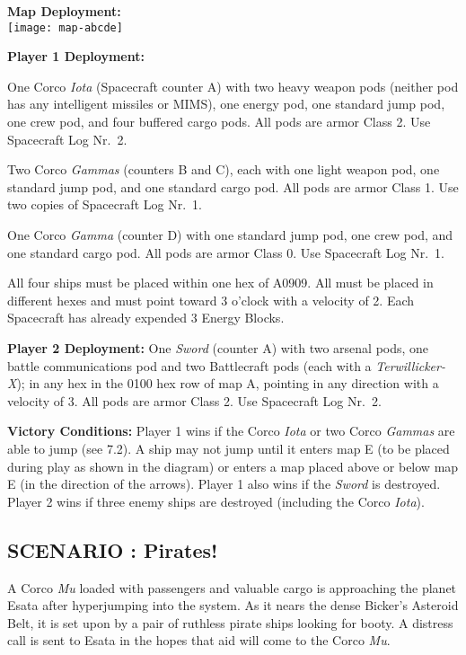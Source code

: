 \textbf{Map Deployment:}\\
\texttt{[image: map-abcde]}

\textbf{Player 1 Deployment:}

One Corco \emph{Iota} (Spacecraft counter A) with two heavy weapon pods
(neither pod has any intelligent missiles or MIMS), one energy pod,
one standard jump pod, one crew pod, and four buffered cargo pods. All
pods are armor Class 2. Use Spacecraft Log Nr.~2.

Two Corco \emph{Gammas} (counters B and C), each with one light weapon
pod, one standard jump pod, and one standard cargo pod. All pods are
armor Class 1. Use two copies of Spacecraft Log Nr.~1.

One Corco \emph{Gamma} (counter D) with one standard jump pod, one
crew pod, and one standard cargo pod. All pods are armor Class 0.  Use
Spacecraft Log Nr.~1.

All four ships must be placed within one hex of A0909. All must be
placed in different hexes and must point toward 3 o'clock with a
velocity of 2. Each Spacecraft has already expended 3 Energy Blocks.

\textbf{Player 2 Deployment:} One \emph{Sword} (counter A) with two
arsenal pods, one battle communications pod and two Battlecraft pods
(each with a \emph{Terwillicker-X}); in any hex in the 0100 hex row of
map A, pointing in any direction with a velocity of 3. All pods are
armor Class 2. Use Spacecraft Log Nr.~2.

\textbf{Victory Conditions:} Player 1 wins if the Corco \emph{Iota} or
two Corco \emph{Gammas} are able to jump (see 7.2). A ship may not
jump until it enters map E (to be placed during play as shown in the
diagram) or enters a map placed above or below map E (in the direction
of the arrows). Player 1 also wins if the \emph{Sword} is destroyed.
Player 2 wins if three enemy ships are destroyed (including the Corco
\emph{Iota}).



\subsection*{SCENARIO \thescenario: Pirates!}
\label{sec:scenario-4:-pirates}



A Corco \emph{Mu} loaded with passengers and valuable cargo is
approaching the planet Esata after hyperjumping into the system. As it
nears the dense Bicker's Asteroid Belt, it is set upon by a pair of
ruthless pirate ships looking for booty. A distress call is sent to
Esata in the hopes that aid will come to the Corco \emph{Mu}.

